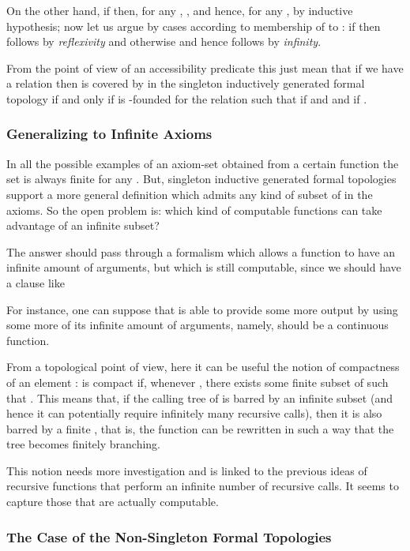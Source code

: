 \documentclass[copyright,creativecommons]{eptcs}
\begin{document}
On the other hand, if  then, for any , 
, and hence, for any , 
by inductive hypothesis; now let us argue by cases according to membership of  to :
if  then  follows by {\em reflexivity} and otherwise
 and hence  follows by {\em infinity}.
\medskip

From the point of view of an accessibility predicate this just mean that if we have a relation
 then  is covered by  in the singleton inductively generated formal topology
 if and only if  is -founded for the relation  such that
 if  and  and  if .
\medskip




\subsubsection{Generalizing to Infinite Axioms}

In all the possible examples of an axiom-set obtained from a certain function  
the set  is always finite for any .
But, singleton inductive generated formal topologies support a more general definition 
which admits any kind of subset of  in the axioms.
So the open problem is: which kind of computable functions can take advantage of 
an infinite subset?

The answer should pass through a formalism which allows a function to have an infinite
amount of arguments, but which is still computable, since we should have a clause like

For instance, one can suppose that  is able to provide some more output by using 
some more of its infinite amount of arguments, namely,  should be a continuous function. 

From a topological point of view, here it can be useful the notion of compactness
of an element :  is compact if, whenever ,
there exists some finite subset  of  such that . 
This means that, if the calling tree of  is barred by an infinite subset  
(and hence it can potentially require infinitely many recursive calls), then it is also barred
by a finite , that is, the function can be rewritten in such a way that the tree becomes
finitely branching. 

This notion needs more investigation and is linked to the previous ideas of recursive 
functions that perform an infinite number of recursive calls. 
It seems to capture those that are actually computable.

\subsubsection{The Case of the Non-Singleton Formal Topologies}
\end{document}
